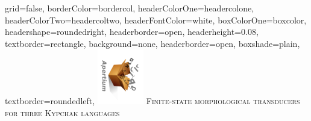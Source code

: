 \documentclass[a0paper,fontscale=0.3]{baposter}  %
\begin{document}
	\setlength{\pdfpageheight}{\paperheight}
	\setlength{\pdfpagewidth}{\paperwidth}

	\background{{
	}}



	\begin{poster}{
			grid=false,
			borderColor=bordercol,
			headerColorOne=headercolone,
			headerColorTwo=headercoltwo,
			headerFontColor=white,
			boxColorOne=boxcolor,
			headershape=roundedright,
  headerborder=open,
  headerheight=0.08\textheight,
			textborder=rectangle,
			background=none,
			headerborder=open,
			boxshade=plain,
			textborder=roundedleft,
		}{
			\hspace{-2em}\includegraphics[angle=90,height=6.5em,bb=0 0 203 242]{apertium5a}
		}{
			{\vspace{0pt}\hspace{-2.2ex}
			{\titlefont \textsc{Finite-state morphological transducers\\for three Kypchak languages}}}
		}{

}
\end{poster}
\end{document}
